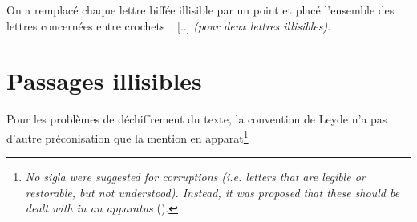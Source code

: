 \documentclass[a4paper,12pt,twoside]{book}
\newcommand{\langue}[1]{\emph{#1}}
\begin{document}
			On a remplacé chaque lettre biffée illisible par un point et placé l'ensemble des lettres concernées entre crochets~: [..] \textit{(pour deux lettres illisibles)}.
		
		\section{Passages illisibles}
			Pour les problèmes de déchiffrement du texte, la convention de Leyde n'a pas d'autre préconisation que la mention en apparat\footnote{\langue{No sigla were suggested for corruptions (i.e. letters that are legible or restorable, but not understood). Instead, it was proposed that these should be dealt with in an apparatus} (\cite{leidenConvention}).}
           	
	\printbibheading[heading=bibintoc]%
	\printbibliography[heading=subbibliography, title=Scripts, keyword=scripts]
\end{document}
